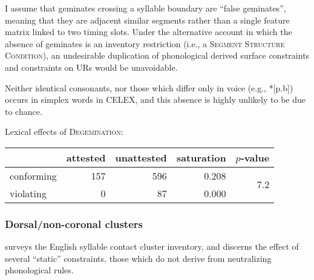 \noindent
I assume that geminates crossing a syllable boundary are ``false geminates'', meaning that they are adjacent similar segments rather than a single feature matrix linked to two timing slots. Under the alternative account in which the absence of geminates is an inventory restriction (i.e., a \textsc{Segment Structure Condition}), an undesirable duplication of phonological derived surface constraints and constraints on URs would be unavoidable.

Neither identical consonants, nor those which differ only in voice (e.g., *[p.b]) occurs in simplex words in CELEX, and this absence is highly unlikely to be due to chance.

\begin{example} Lexical effects of \textsc{Degemination}: 

\vspace{0.5\baselineskip}
\begin{tabular}{l r r r r}
\toprule
           & attested & unattested & saturation & $p$-value \\
\midrule
conforming & 157 & 596 & 0.208 & \multirow{2}{*}{7.2\e{-09}}\\
violating  &   0 &  87 & 0.000 \\
\bottomrule
\end{tabular}
\end{example}


\subsubsection{Dorsal/non-coronal clusters}

\citet{Pierrehumbert1994} surveys the English syllable contact cluster inventory, and discerns the effect of several ``static'' constraints, those which do not derive from neutralizing phonological rules. 

